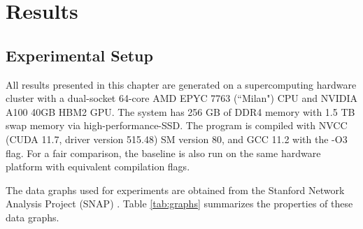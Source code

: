 \chapter{Results}
\label{chap:Results}

\section{Experimental Setup} \label{sec:expt-info}
All results presented in this chapter are generated on a supercomputing hardware cluster with a dual-socket 64-core AMD EPYC 7763 (``Milan") CPU and NVIDIA A100 40GB HBM2 GPU.
The system has 256 GB of DDR4 memory with 1.5 TB swap memory via high-performance-SSD.
The program is compiled with NVCC (CUDA 11.7, driver version 515.48) SM version 80, and GCC 11.2 with the -O3 flag.
For a fair comparison, the baseline is also run on the same hardware platform with equivalent compilation flags.

The data graphs used for experiments are obtained from the Stanford Network Analysis Project (SNAP) \cite{snap}.
Table \ref{tab:graphs} summarizes the properties of these data graphs.

